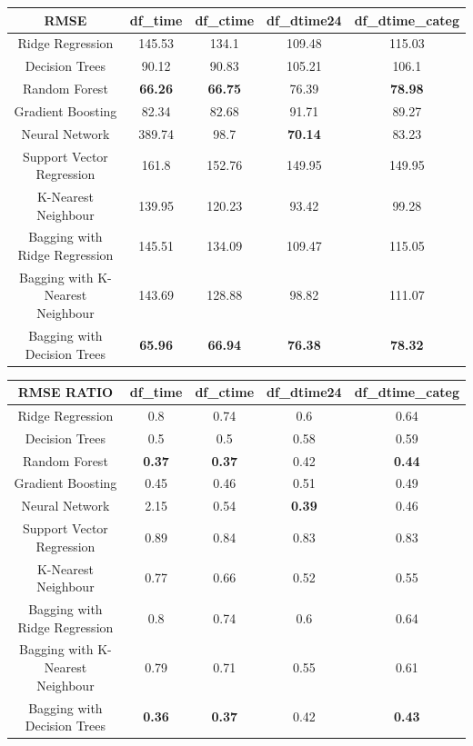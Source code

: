 \documentclass[12pt]{article}
\begin{document}
	\begin{center}
		\begin{tabular}{ |c|c|c|c|c|  } 
			\hline
			\textbf{RMSE} & df\_time & df\_ctime & df\_dtime24 & df\_dtime\_categ \\
			\hline
			Ridge Regression & 145.53 & 134.1 & 109.48 & 115.03 \\
			Decision Trees & 90.12 & 90.83 & 105.21 & 106.1 \\
			Random Forest & \textbf{66.26} & \textbf{66.75} & 76.39 & \textbf{78.98} \\
			Gradient Boosting & 82.34 & 82.68 & 91.71 & 89.27 \\
			Neural Network & 389.74 & 98.7 &\textbf{ 70.14} & 83.23 \\
			Support Vector Regression & 161.8 & 152.76 & 149.95 & 149.95 \\
			K-Nearest Neighbour & 139.95 & 120.23 & 93.42 & 99.28 \\
			Bagging with Ridge Regression & 145.51 & 134.09 & 109.47 & 115.05 \\
			Bagging with K-Nearest Neighbour & 143.69 & 128.88 & 98.82 & 111.07 \\
			Bagging with Decision Trees & \textbf{65.96} &\textbf{ 66.94} & \textbf{76.38} & \textbf{78.32} \\
			\hline
		\end{tabular}
	\end{center}

\begin{center}
	\begin{tabular}{ |c|c|c|c|c|  } 
		\hline
		\textbf{RMSE RATIO} & df\_time & df\_ctime & df\_dtime24 & df\_dtime\_categ \\
		\hline
		Ridge Regression & 0.8 & 0.74 & 0.6 & 0.64 \\
		Decision Trees & 0.5 & 0.5 & 0.58 & 0.59 \\
		Random Forest & \textbf{0.37} & \textbf{0.37} & 0.42 & \textbf{0.44} \\
		Gradient Boosting & 0.45 & 0.46 & 0.51 & 0.49 \\
		Neural Network & 2.15 & 0.54 &\textbf{ 0.39} & 0.46 \\
		Support Vector Regression & 0.89 & 0.84 & 0.83 & 0.83 \\
		K-Nearest Neighbour & 0.77 & 0.66 & 0.52 & 0.55 \\
		Bagging with Ridge Regression & 0.8 & 0.74 & 0.6 & 0.64 \\
		Bagging with K-Nearest Neighbour & 0.79 & 0.71 & 0.55 & 0.61 \\
		Bagging with Decision Trees & \textbf{0.36} & \textbf{0.37} & 0.42 & \textbf{0.43} \\
		\hline
	\end{tabular}
\end{center}
	
\end{document}
